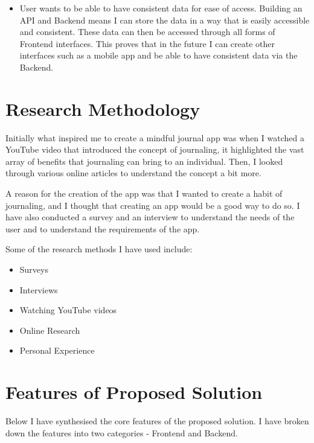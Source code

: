 \begin{itemize}

            \item User wants to be able to have consistent data for ease of access. Building an API and Backend means I can store the data in a way that is easily accessible and consistent. These data can then be accessed through all forms of Frontend interfaces. This proves that in the future I can create other interfaces such as a mobile app and be able to have consistent data via the Backend.

    \end{itemize}




\section{Research Methodology}
Initially what inspired me to create a mindful journal app was when I watched a YouTube video that introduced the concept of journaling, it highlighted the vast array of benefits that journaling can bring to an individual. Then, I looked through various online articles to understand the concept a bit more. 

A reason for the creation of the app was that I wanted to create a habit of journaling, and I thought that creating an app would be a good way to do so. I have also conducted a survey and an interview to understand the needs of the user and to understand the requirements of the app.

Some of the research methods I have used include:
\begin{itemize}
  \item Surveys
  \item Interviews
  \item Watching YouTube videos
  \item Online Research
  \item Personal Experience
\end{itemize}

\section{Features of Proposed Solution}
Below I have synthesised the core features of the proposed solution. I have broken down the features into two categories - Frontend and Backend.
